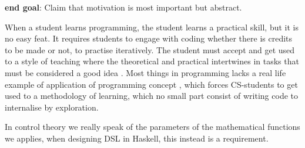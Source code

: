 \textbf{end goal}: Claim that motivation is most important but abstract.
\newline

When a student learns programming, the student learns a practical skill, but it is no easy feat. It requires students to engage with coding whether there is credits to be made or not, \cite{jenkins_2001} to practise iteratively. The student must accept and get used to a style of teaching where the theoretical and practical intertwines in tasks that must be considered a good idea \cite{jenkins_2001}. 
Most things in programming lacks a real life example of application of programming concept \cite{dunican_2002}, which forces CS-students to get used to a methodology of learning, which no small part consist of writing code to internalise by exploration.

In control theory we really speak of the parameters of the mathematical functions we applies, when designing \gls{DSL} in \gls{Haskell}, this instead is a requirement. 

\fi

\iffalse 
\subsection{ideas about content}

\begin{itemize}
    \item Here we should write about what could have been done better.
    
    -planning, strict structure vs agility, early study section vs continuous learning \& iterative design
    
    -start small, not try to tackle everything immediately 
    


\item Ethics goes here and it is important that it is a natural part of the text. We can use a lot of inspiration from the planeringsrapport text but i think it will be good to start fresh to get an improved structure and make it more natural.

-Availability:why we wanted the material to be in english, the importance of it being available on github. 

- consideration of how it can impact students learning, will they learn it the ``wrong'' way(use haskell on the exam? will it actually contribute to a deeper understanding?. Here we will write what our intentions with the material was and why we think it is unlikely that it will be used the wrong way

-we said we would write a part about the ethics of control systems in the material. If we do that mention that we did it and why we did it.
\end{itemize}
\fi 


